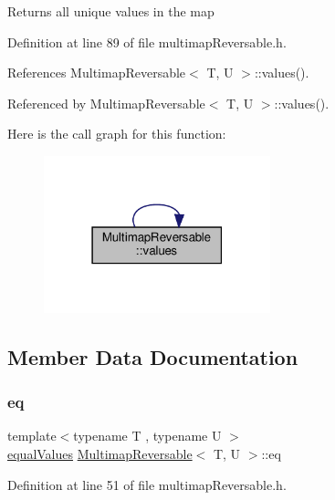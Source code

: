 \begin{DoxyReturn}{Returns}
all unique values in the map 
\end{DoxyReturn}


Definition at line 89 of file multimap\+Reversable.\+h.



References Multimap\+Reversable$<$ T, U $>$\+::values().



Referenced by Multimap\+Reversable$<$ T, U $>$\+::values().

Here is the call graph for this function\+:\nopagebreak
\begin{figure}[H]
\begin{center}
\leavevmode
\includegraphics[width=186pt]{classMultimapReversable_a85a6dee36cb566aa874e9d18b5328757_cgraph}
\end{center}
\end{figure}


\subsection{Member Data Documentation}
\mbox{\label{classMultimapReversable_aca94996435f9aef6866914049a87c303}} 
\subsubsection{\texorpdfstring{eq}{eq}}
{\footnotesize\ttfamily template$<$typename T , typename U $>$ \\
\hyperlink{classMultimapReversable_a73c1b30be5bb8d65b1bcfa5e0958a581}{equal\+Values} \hyperlink{classMultimapReversable}{Multimap\+Reversable}$<$ T, U $>$\+::eq\hspace{0.3cm}{\ttfamily [private]}}



Definition at line 51 of file multimap\+Reversable.\+h.


